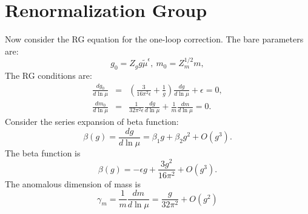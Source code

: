 \section{Renormalization Group}
Now consider the RG equation for the one-loop correction. 
The bare parameters are:
\begin{equation}
	g_0 = Z_g g\tilde{\mu}^{\epsilon},\ 
	m_0 = Z_m^{1/2} m,
\end{equation}
The RG conditions are:
\begin{eqnarray}
	\frac{d g_0}{d\ln \mu}
	&=& \left(\frac{3}{16\pi^2 \epsilon} + \frac{1}{g}\right)\frac{dg}{d\ln \mu} + \epsilon = 0, \\
	\frac{d m_0}{d\ln \mu}
	&=& \frac{1}{32\pi^2 \epsilon}\frac{dg}{d\ln \mu} + \frac{1}{m}\frac{dm}{d \ln \mu} = 0.
\end{eqnarray}
Consider the series expansion of beta function:
\begin{equation}
	\beta(g) = \frac{dg}{d\ln \mu} = \beta_1 g + \beta_2 g^2 +O(g^3).
\end{equation}
The beta function is
\begin{equation}
	\beta(g) = -\epsilon g + \frac{3g^2}{16\pi^2} + O(g^3).
\end{equation}
The anomalous dimension of mass is
\begin{equation}
	\gamma_m = \frac{1}{m}\frac{dm}{d \ln \mu} = \frac{g}{32\pi^2}+O(g^2)
\end{equation}




